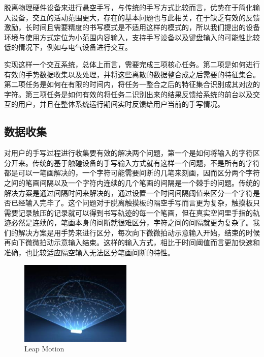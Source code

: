 \documentclass[10pt, twocolumn]{article}
\begin{document}
	脱离物理硬件设备来进行悬空手写，与传统的手写方式比较而言，优势在于简化输入设备，交互的活动范围更大，存在的基本问题也与此相关，在于缺乏有效的反馈激励，长时间且需要精度的书写模式是不适用这样的模式的，所以我们提出的设备环境与使用方式定位为小范围内容输入，支持手写设备以及键盘输入的可能性比较低的情况下，例如与电气设备进行交互。

	实现这样一个交互系统，总体上而言，需要完成三项核心任务。第二项是如何进行有效的手势数据收集以及处理，并将这些离散的数据整合成之后需要的特征集合。第二项任务是如何在有限的时间内，将任务一整合之后的特征集合识别成其对应的字符。第三项任务是如何有效的将任务二识别出来的结果反馈给系统的前台以及交互的用户，并且在整体系统运行期间实时反馈给用户当前的手写情况。

	\subsection{数据收集}

	对用户的手写过程进行收集要有效的解决两个问题，第一个是如何将输入的字符区分开来。传统的基于触碰设备的手写输入方式就有这样一个问题，不是所有的字符都是可以一笔画解决的，一个字符可能需要间断的几笔来刻画，因而区分两个字符之间的笔画间隔以及一个字符内连续的几个笔画的间隔是一个棘手的问题。传统的解决方案是通过间隔时间来解决的，通过设置一个时间间隔阈值来区分一个字符是否已经输入完毕了。这个问题对于脱离触摸板的隔空手写而言更为复杂，触摸板只需要记录触压的记录就可以得到书写轨迹的每一个笔画，但在真实空间里手指的轨迹必然是连续的，笔画本身的间断就很难区分，字符之间的间隔就更为复杂了。我们的解决方案是用手势来进行区分，每次向下微微拍动示意输入开始，结束的时候再向下微微拍动示意输入结束。这样的输入方式，相比于时间阈值而言更加快速和准确，也比较适应隔空输入无法区分笔画间断的特性。

	\begin{figure}[htb]
	\centering
	\begin{minipage}[t]{0.8\linewidth}
	\centering
	\includegraphics[height=4cm]{leapmotion.jpg}
	\caption{Leap Motion}
	\label{fig: sample_cnn}
	\end{minipage}
	\end{figure}
\end{document}
